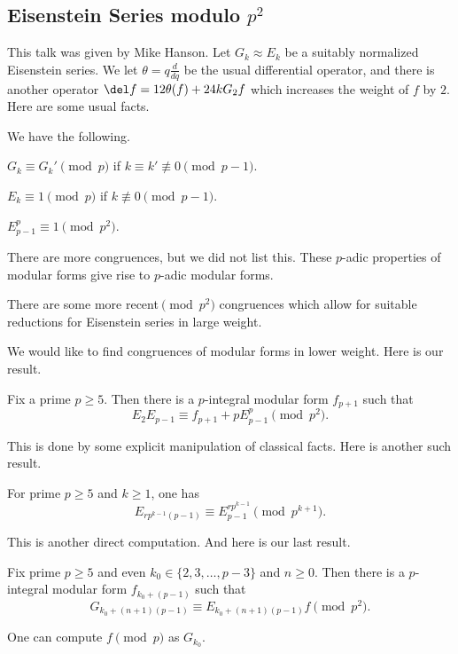 \documentclass{article}
\begin{document}
\subsection{Eisenstein Series modulo \texorpdfstring{$p^2$}{p2}}
This talk was given by Mike Hanson. Let $G_k\approx E_k$ be a suitably normalized Eisenstein series. We let $\theta=q\frac d{dq}$ be the usual differential operator, and there is another operator $\del f=12\theta(f)+24kG_2f$ which increases the weight of $f$ by $2$. Here are some usual facts.
\begin{proposition}
	We have the following.
	\begin{listalph}
		\item $G_k\equiv G_k'\pmod p$ if $k\equiv k'\not\equiv0\pmod{p-1}$.
		\item $E_k\equiv1\pmod p$ if $k\not\equiv0\pmod{p-1}$.
		\item $E_{p-1}^p\equiv1\pmod{p^2}$.
	\end{listalph}
\end{proposition}
There are more congruences, but we did not list this. These $p$-adic properties of modular forms give rise to $p$-adic modular forms.
\begin{remark}
	There are some more recent$\pmod{p^2}$ congruences which allow for suitable reductions for Eisenstein series in large weight.
\end{remark}
We would like to find congruences of modular forms in lower weight. Here is our result.
\begin{theorem}
	Fix a prime $p\ge5$. Then there is a $p$-integral modular form $f_{p+1}$ such that
	\[E_2E_{p-1}\equiv f_{p+1}+pE_{p-1}^p\pmod{p^2}.\]
\end{theorem}
This is done by some explicit manipulation of classical facts. Here is another such result.
\begin{theorem}
	For prime $p\ge5$ and $k\ge1$, one has
	\[E_{rp^{k-1}(p-1)}\equiv E^{rp^{k-1}}_{p-1}\pmod{p^{k+1}}.\]
\end{theorem}
This is another direct computation. And here is our last result.
\begin{theorem}
	Fix prime $p\ge 5$ and even $k_0\in\{2,3,\ldots,p-3\}$ and $n\ge0$. Then there is a $p$-integral modular form $f_{k_0+(p-1)}$ such that
	\[G_{k_0+(n+1)(p-1)}\equiv E_{k_0+(n+1)(p-1)}f\pmod {p^2}.\]
\end{theorem}
\begin{remark}
	One can compute $f\pmod p$ as $G_{k_0}$.
\end{remark}
\end{document}
